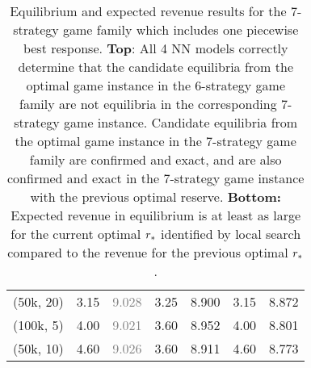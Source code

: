 \begin{table}[htbp]
\begin{tabular}{l|cc|cc|cc|}
(50k, 20)  & 3.15 & \textcolor{gray}{9.028} & 3.25  & 8.900 & 3.15 & 8.872 \\
(100k, 5)  & 4.00 & \textcolor{gray}{9.021} & 3.60  & 8.952 & 4.00 & 8.801 \\
(50k, 10)  & 4.60 & \textcolor{gray}{9.026} & 3.60  & 8.911 & 4.60 & 8.773 \\
\end{tabular}
\caption{Equilibrium and expected revenue results for the 7-strategy game family which includes one piecewise best response. \textbf{Top}: All 4 NN models correctly determine that the candidate equilibria from the optimal game instance in the 6-strategy game family are not equilibria in the corresponding 7-strategy game instance. Candidate equilibria from the optimal game instance in the 7-strategy game family are confirmed and exact, and are also confirmed and exact in the 7-strategy game instance with the previous optimal reserve. \textbf{Bottom:} Expected revenue in equilibrium is at least as large for the current optimal $r_*$ identified by local search compared to the revenue for the previous optimal $r_*$.}
\label{iter0_iter1_results}
\end{table}
